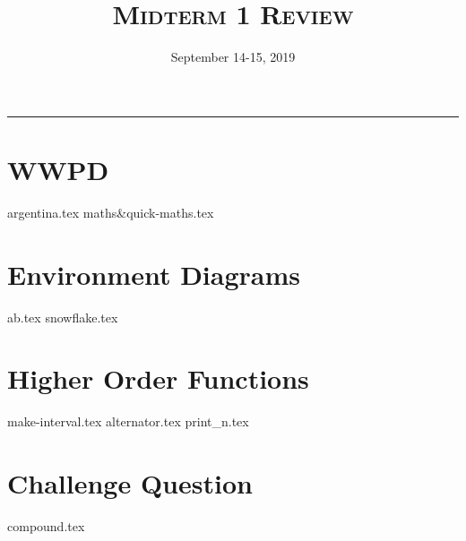 \documentclass{exam}
\title{\textsc{Midterm 1 Review}}
\date{September 14-15, 2019}
\begin{document}
\maketitle
\rule{\textwidth}{0.15em}
\fontsize{12}{15}\selectfont


\section{WWPD}
\begin{questions}
{argentina.tex}
{maths&quick-maths.tex}
\end{questions}

\newpage
\section{Environment Diagrams}
\begin{questions}
{ab.tex}
\newpage
{snowflake.tex}

\end{questions}

\newpage
\section{Higher Order Functions}
\begin{questions}
{make-interval.tex}
{alternator.tex}
{print_n.tex}

\end{questions}


\section{Challenge Question}
\begin{questions}
{compound.tex}
\end{questions}
\end{document}
